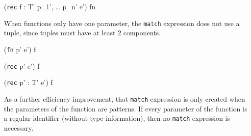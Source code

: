 \documentclass[class=article, crop=false]{standalone}
\begin{document}
  {\gamma \vdash (\texttt{rec} \; f : T' \; \; p_1', \; \dots \; p_n' \Rightarrow e') \Rightarrow fn}

When functions only have one parameter, the \texttt{match} expression does not use a tuple, since tuples must have at least 2 components.

\bigskip

  {\gamma \vdash (\texttt{fn} \; p' \Rightarrow e') \Rightarrow f}

  {\gamma \vdash (\texttt{rec} \; p' \Rightarrow e') \Rightarrow f}

  {\gamma \vdash (\texttt{rec} \; p' : T' \Rightarrow e') \Rightarrow f}


As a further efficiency improvement, that \texttt{match} expression is only created when the parameters of the function are patterns.
If every parameter of the function is a regular identifier (without type information), then no \texttt{match} expression is necessary.
\end{document}
